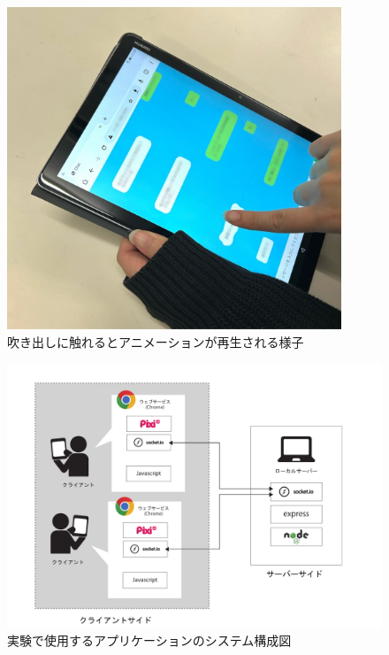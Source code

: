 \documentclass[11pt,a4paper]{ltjsreport}
\begin{document}
\begin{figure}[htbp]
    \begin{center}
        \includegraphics[width=100mm]{PDF/zikken_gamen.jpg}
        \caption{吹き出しに触れるとアニメーションが再生される様子}
        \label{figure:zikken_gamen}
    \end{center}
\end{figure}

\begin{figure}[htbp]
    \begin{center}
        \includegraphics[width=150mm]{PDF/system_2.pdf}
        \caption{実験で使用するアプリケーションのシステム構成図}
        \label{figure:system}
    \end{center}
\end{figure}
\end{document}
